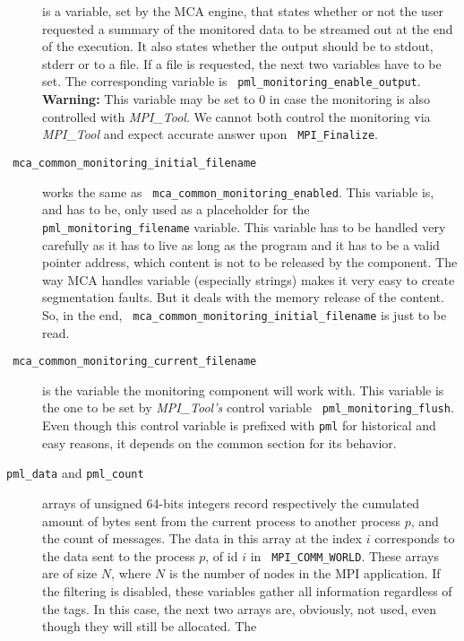 \documentclass[notitlepage]{article}
\newcommand{\mpit}[1]{\textit{MPI\_Tool#1}}
\newcommand{\brkunds}[0]{\allowbreak\_}
\begin{document}
\begin{description}
  is a variable, set by the MCA engine, that states whether or not the
  user requested a summary of the monitored data to be streamed out at
  the end of the execution. It also states whether the output should
  be to stdout, stderr or to a file. If a file is requested, the next
  two variables have to be set. The corresponding variable is {\tt
    pml\brkunds{}monitoring\brkunds{}enable\brkunds{}output}. {\bf
    Warning:} This variable may be set to 0 in case the monitoring is
  also controlled with \mpit{}. We cannot both control the monitoring
  via \mpit{} and expect accurate answer upon {\tt
    MPI\brkunds{}Finalize}.
\item[{\tt
    mca\brkunds{}common\brkunds{}monitoring\brkunds{}initial\brkunds{}filename}]
  works the same as {\tt
    mca\brkunds{}common\brkunds{}monitoring\brkunds{}ena\allowbreak{}bled}. This
  variable is, and has to be, only used as a placeholder for the {\tt
    pml\brkunds{}monitoring\allowbreak\brkunds{}filename}
  variable. This variable has to be handled very carefully as it has
  to live as long as the program and it has to be a valid pointer
  address, which content is not to be released by the component. The
  way MCA handles variable (especially strings) makes it very easy to
  create segmentation faults. But it deals with the memory release of
  the content. So, in the end, {\tt
    mca\brkunds{}common\brkunds{}monitoring\brkunds{}initial\brkunds{}filename}
  is just to be read.
\item[{\tt
    mca\brkunds{}common\brkunds{}monitoring\brkunds{}current\brkunds{}filename}]
  is the variable the monitoring component will work with. This
  variable is the one to be set by \mpit{'s} control variable {\tt
    pml\brkunds{}monitoring\brkunds{}flush}. Even though this control
  variable is prefixed with {\tt pml} for historical and easy reasons,
  it depends on the common section for its behavior.
\item[{\tt pml\brkunds{}data} and {\tt pml\brkunds{}count}] arrays of
  unsigned 64-bits integers record respectively the cumulated amount
  of bytes sent from the current process to another process $p$, and
  the count of messages. The data in this array at the index $i$
  corresponds to the data sent to the process $p$, of id $i$ in {\tt
    MPI\brkunds{}COMM\brkunds{}WORLD}. These arrays are of size $N$,
  where $N$ is the number of nodes in the MPI application. If the
  filtering is disabled, these variables gather all information
  regardless of the tags. In this case, the next two arrays are,
  obviously, not used, even though they will still be allocated. The

\end{description}
\end{document}
